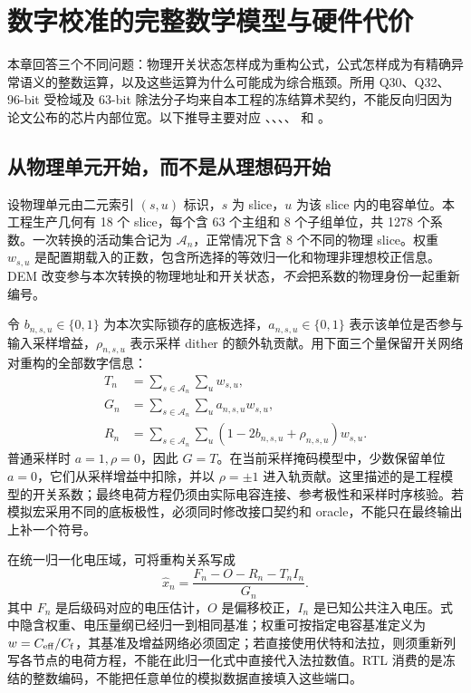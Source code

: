 \chapter{数字校准的完整数学模型与硬件代价}
\label{ch:cal-depth}
本章回答三个不同问题：物理开关状态怎样成为重构公式，公式怎样成为有精确异常语义的整数运算，以及这些运算为什么可能成为综合瓶颈。所用 Q30、Q32、96-bit 受检域及 63-bit 除法分子均来自本工程的冻结算术契约，不能反向归因为论文公布的芯片内部位宽。以下推导主要对应 、、、、 和 。

\section{从物理单元开始，而不是从理想码开始}
设物理单元由二元索引 \((s,u)\) 标识，\(s\) 为 slice，\(u\) 为该 slice 内的电容单位。本工程生产几何有 18 个 slice，每个含 63 个主组和 8 个子组单位，共 1278 个系数。一次转换的活动集合记为 \(\mathcal A_n\)，正常情况下含 8 个不同的物理 slice。权重 \(w_{s,u}\) 是配置期载入的正数，包含所选择的等效归一化和物理非理想校正信息。DEM 改变参与本次转换的物理地址和开关状态，\emph{不会}把系数的物理身份一起重新编号。

令 \(b_{n,s,u}\in\{0,1\}\) 为本次实际锁存的底板选择，\(a_{n,s,u}\in\{0,1\}\) 表示该单位是否参与输入采样增益，\(\rho_{n,s,u}\) 表示采样 dither 的额外轨贡献。用下面三个量保留开关网络对重构的全部数字信息：
\begin{align}
T_n &= \sum_{s\in\mathcal A_n}\sum_u w_{s,u},\\
G_n &= \sum_{s\in\mathcal A_n}\sum_u a_{n,s,u}w_{s,u},\\
R_n &= \sum_{s\in\mathcal A_n}\sum_u
       (1-2b_{n,s,u}+\rho_{n,s,u})w_{s,u}.
\end{align}
普通采样时 \(a=1,\rho=0\)，因此 \(G=T\)。在当前采样掩码模型中，少数保留单位 \(a=0\)，它们从采样增益中扣除，并以 \(\rho=\pm1\) 进入轨贡献。这里描述的是工程模型的开关系数；最终电荷方程仍须由实际电容连接、参考极性和采样时序核验。若模拟宏采用不同的底板极性，必须同时修改接口契约和 oracle，不能只在最终输出上补一个符号。

在统一归一化电压域，可将重构关系写成
\begin{equation}
\hat x_n=\frac{F_n-O-R_n-T_n I_n}{G_n}.
\label{eq:physical-calibration}
\end{equation}
其中 \(F_n\) 是后级码对应的电压估计，\(O\) 是偏移校正，\(I_n\) 是已知公共注入电压。式中隐含权重、电压量纲已经归一到相同基准；权重可按指定电容基准定义为 \(w=C_{\rm eff}/C_{\rm f}\)，其基准及增益网络必须固定；若直接使用伏特和法拉，则须重新列写各节点的电荷方程，不能在此归一化式中直接代入法拉数值。RTL 消费的是冻结的整数编码，不能把任意单位的模拟数据直接填入这些端口。

